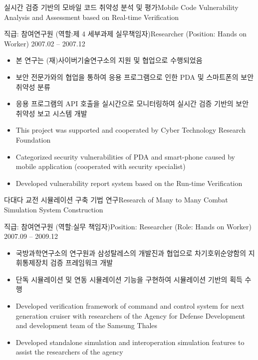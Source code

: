 \documentclass[english,representative]{resume_structure}
\begin{document}
\begin{Project}
  
{실시간 검증 기반의 모바일 코드 취약성 분석 및 평가}{Mobile Code Vulnerability Analysis and Assessment based on Real-time Verification}
{}{} 
{
\ResumeSubSection %
    {직급: 참여연구원 (역할:제 4 세부과제 실무책임자)}{Researcher (Position: Hands on Worker)}
    {2007.02 -- 2007.12}
    {
      \begin{itemize}
        \item 본 연구는 (재)사이버기술연구소의 지원 및 협업으로 수행되었음
        \item 보안 전문가와의 협업을 통하여 응용 프로그램으로 인한 PDA 및 스마트폰의 보안 취약성 분류
        \item 응용 프로그램의 API 호출을 실시간으로 모니터링하여 실시간 검증 기반의 보안 취약성 보고 시스템 개발
      \end{itemize}
    }
    {
      \begin{itemize}
        \item This project was supported and cooperated by Cyber Technology Research Foundation
        \item Categorized security vulnerabilities of PDA and smart-phone caused by mobile application (cooperated with security specialist)
        \item Developed vulnerability report system based on the Run-time Verification 
      \end{itemize}
    }
}

{다대다 교전 시뮬레이션 구축 기법 연구}{Research of Many to Many Combat Simulation System Construction}
{}{} 
{
\ResumeSubSection %
    {직급: 참여연구원 (역할:실무 책임자)}{Position: Researcher (Role: Hands on Worker)}
    {2007.09 -- 2009.12}
    {
      \begin{itemize}
        \item 국방과학연구소의 연구원과 삼성탈레스의 개발진과 협업으로 차기호위순양함의 지휘통제장치 검증 프레임워크 개발
        \item 단독 시뮬레이션 및 연동 시뮬레이션 기능을 구현하여 시뮬레이션 기반의 획득 수행
      \end{itemize}
    }
    {
      \begin{itemize}
        \item Developed verification framework of command and control system for next generation cruiser with researchers of the Agency for Defense Development and development team of the Samsung Thales
        \item Developed standalone simulation and interoperation simulation features to assist the researchers of the agency
      \end{itemize}
    }
}


\end{Project}
\end{document}
